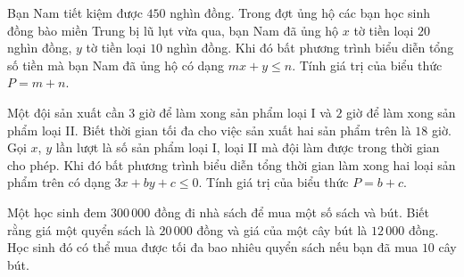 \begin{bt}%
	Bạn Nam tiết kiệm được $450$ nghìn đồng. Trong đợt ủng hộ các  bạn học sinh đồng bào miền Trung bị lũ lụt vừa qua, bạn Nam đã ủng hộ $x$ tờ tiền loại $20$ nghìn đồng, $y$ tờ tiền loại $10$ nghìn đồng. Khi đó bất phương trình biểu diễn tổng số tiền mà bạn Nam đã ủng hộ có dạng $mx+y\le n$. Tính giá trị của biểu thức $P=m+n$.
\end{bt}

\begin{bt}%
	Một đội sản xuất cần $3$ giờ để làm xong sản phẩm loại I và $2$ giờ để làm xong sản phẩm loại II. Biết thời gian tối đa cho việc sản xuất hai sản phẩm trên là $18$ giờ. Gọi $x$, $y$ lần lượt là số sản phẩm loại I, loại II mà đội làm được trong thời gian cho phép. Khi đó bất phương trình biểu diễn tổng thời gian làm xong hai  loại sản phẩm trên có dạng $3x+by+c\le 0$. Tính giá trị của biểu thức $P=b+c$.
\end{bt}

\begin{bt}%
	Một học sinh đem $300\,000$ đồng đi nhà sách để mua một số sách và bút. Biết rằng 
	giá một quyển sách là $20\,000$ đồng và  giá của một cây bút là $12\,000$ đồng. Học sinh đó có thể
	mua được tối đa bao nhiêu quyển sách nếu bạn  đã mua $10$ cây bút.
\end{bt}

